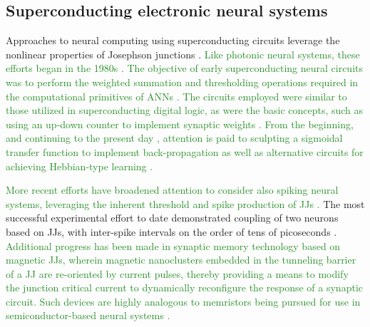 \documentclass{article}
\begin{document}
\begin{multicols}{2}
\subsection{Superconducting electronic neural systems}
Approaches to neural computing using superconducting circuits leverage the nonlinear properties of Josephson junctions \cite{hias2007,sele2017,scdo2018}. \textcolor{ForestGreen}{Like photonic neural systems, these efforts began in the 1980s \cite{ai1989,og1989}. The objective of early superconducting neural circuits was to perform the weighted summation and thresholding operations required in the computational primitives of ANNs \cite{hago1991,hiak1991}. The circuits employed were similar to those utilized in superconducting digital logic, as were the basic concepts, such as using an up-down counter to implement synaptic weights \cite{hiak1991}. From the beginning, and continuing to the present day \cite{sckl2016,klsc2018,sosc2018}, attention is paid to sculpting a sigmoidal transfer function to implement back-propagation as well as alternative circuits for achieving Hebbian-type learning \cite{hago1991}.} 

\textcolor{ForestGreen}{More recent efforts have broadened attention to consider also spiking neural systems, leveraging the inherent threshold and spike production of JJs \cite{crsc2010,scdo2018}.}  The most successful experimental effort to date demonstrated coupling of two neurons based on JJs, with inter-spike intervals on the order of tens of picoseconds \cite{sele2017}. \textcolor{ForestGreen}{Additional progress has been made in synaptic memory technology based on magnetic JJs, wherein magnetic nanoclusters embedded in the tunneling barrier of a JJ are re-oriented by current pulses, thereby providing a means to modify the junction critical current \cite{scdo2020} to dynamically reconfigure the response of a synaptic circuit. Such devices are highly analogous to memristors being pursued for use in semiconductor-based neural systems \cite{kiha2018}.} 


\end{multicols}
\end{document}
